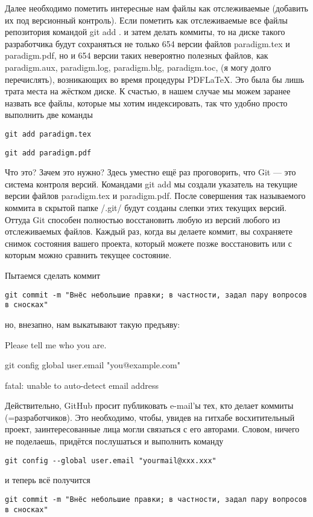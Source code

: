 \documentclass[11pt]{article}
\theoremstyle{remark}
\theoremstyle{definition}
\begin{document}
Далее необходимо пометить интересные нам файлы как отслеживаемые (добавить их под версионный контроль). Если пометить как отслеживаемые все файлы репозитория командой git add . и затем делать коммиты, то на диске такого разработчика будут сохраняться не только 654 версии файлов paradigm.tex и paradigm.pdf, но и 654 версии таких невероятно полезных файлов, как paradigm.aux, paradigm.log, paradigm.blg, paradigm.toc, (я могу долго перечислять), возникающих во время процедуры PDF\LaTeX. Это была бы лишь трата места на жёстком диске. К счастью, в нашем случае мы можем заранее назвать все файлы, которые мы хотим индексировать, так что удобно просто выполнить две команды
\begin{verbatim}git add paradigm.tex\end{verbatim} 
\begin{verbatim}git add paradigm.pdf\end{verbatim}

Что это? Зачем это нужно? Здесь уместно ещё раз проговорить, что Git --- это система контроля версий. Командами git add мы создали указатель на текущие версии файлов paradigm.tex и paradigm.pdf. После совершения так называемого коммита в скрытой папке /.git/ будут созданы слепки этих текущих версий. Оттуда Git способен полностью восстановить любую из версий любого из отслеживаемых файлов. Каждый раз, когда вы делаете коммит, вы сохраняете снимок состояния вашего проекта, который можете позже восстановить или с которым можно сравнить текущее состояние.

Пытаемся сделать коммит\begin{verbatim}git commit -m "Внёс небольшие правки; в частности, задал пару вопросов в сносках"\end{verbatim}
но, внезапно, нам выкатывают такую предъяву:

Please tell me who you are.

git config \text{-}\text{-}global user.email "you@example.com"

fatal: unable to auto-detect email address

\bigskip

Действительно, GitHub просит публиковать e-mail'ы тех, кто делает коммиты (=разработчиков). Это необходимо, чтобы, увидев на гитхабе восхитительный проект, заинтересованные лица могли связаться с его авторами. Словом, ничего не поделаешь, придётся послушаться и выполнить команду
\begin{verbatim}git config --global user.email "yourmail@xxx.xxx"\end{verbatim}
и теперь всё получится 
\begin{verbatim}git commit -m "Внёс небольшие правки; в частности, задал пару вопросов в сносках"\end{verbatim}
\end{document}
